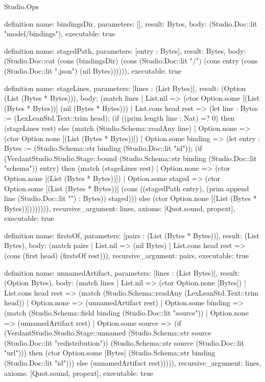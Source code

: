 \begin{lexlean}{Studio.Ops}
\begin{semanticmodule}
{definition{
  name: bindingsDir,
  parameters: [],
  result: Bytes,
  body: (Studio.Doc::lit "model/bindings"),
  executable: true
}

definition{
  name: stagedPath,
  parameters: [entry : Bytes],
  result: Bytes,
  body: (Studio.Doc::cat (cons (bindingsDir) (cons (Studio.Doc::lit "/") (cons entry (cons (Studio.Doc::lit ".json") (nil Bytes)))))),
  executable: true
}

definition{
  name: stageLines,
  parameters: [lines : (List Bytes)],
  result: (Option (List (Bytes * Bytes))),
  body: (match lines
    | List.nil => (ctor Option.some [(List (Bytes * Bytes))] (nil (Bytes * Bytes)))
    | List.cons head rest => (let line : Bytes := (LexLeanStd.Text::trim head); (if ((prim length line : Nat) =? 0) then (stageLines rest) else (match (Studio.Schema::readAny line)
      | Option.none => (ctor Option.none [(List (Bytes * Bytes))])
      | Option.some binding => (let entry : Bytes := (Studio.Schema::str binding (Studio.Doc::lit "id")); (if (VerdantStudio.Studio.Stage::bound (Studio.Schema::str binding (Studio.Doc::lit "schema")) entry) then (match (stageLines rest)
        | Option.none => (ctor Option.none [(List (Bytes * Bytes))])
        | Option.some staged => (ctor Option.some [(List (Bytes * Bytes))] (cons ((stagedPath entry), (prim append line (Studio.Doc::lit "\n") : Bytes)) staged))) else (ctor Option.none [(List (Bytes * Bytes))]))))))),
  recursive_argument: lines,
  axioms: [Quot.sound, propext],
  executable: true
}

definition{
  name: firstsOf,
  parameters: [pairs : (List (Bytes * Bytes))],
  result: (List Bytes),
  body: (match pairs
    | List.nil => (nil Bytes)
    | List.cons head rest => (cons (first head) (firstsOf rest))),
  recursive_argument: pairs,
  executable: true
}

definition{
  name: unnamedArtifact,
  parameters: [lines : (List Bytes)],
  result: (Option Bytes),
  body: (match lines
    | List.nil => (ctor Option.none [Bytes])
    | List.cons head rest => (match (Studio.Schema::readAny (LexLeanStd.Text::trim head))
      | Option.none => (unnamedArtifact rest)
      | Option.some binding => (match (Studio.Schema::field binding (Studio.Doc::lit "source"))
        | Option.none => (unnamedArtifact rest)
        | Option.some source => (if (VerdantStudio.Studio.Stage::unnamed (Studio.Schema::str source (Studio.Doc::lit "redistribution")) (Studio.Schema::str source (Studio.Doc::lit "url"))) then (ctor Option.some [Bytes] (Studio.Schema::str binding (Studio.Doc::lit "id"))) else (unnamedArtifact rest))))),
  recursive_argument: lines,
  axioms: [Quot.sound, propext],
  executable: true
}

}
\end{semanticmodule}
\end{lexlean}
